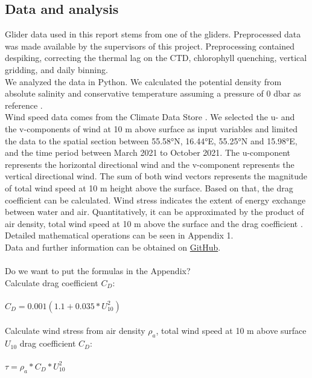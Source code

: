 \documentclass[../Main.tex]{subfiles}
\begin{document}
\subsection{Data and analysis}
Glider data used in this report stems from one of the gliders. 
Preprocessed data was made available by the supervisors of this project. 
Preprocessing contained despiking, correcting the thermal lag on the CTD, chlorophyll quenching, vertical gridding, and daily binning. 
\\
We analyzed the data in Python. We calculated the potential density from absolute salinity and conservative temperature assuming a pressure of 0 dbar as reference \cite{GSW2017}.
\\ 
Wind speed data comes from the Climate Data Store \cite{Era5}. 
We selected the u- and the v-components of wind at 10 m above surface as input variables and limited the data to the spatial section between 55.58°N, 16.44°E, 55.25°N and 15.98°E, and the time period between March 2021 to October 2021. 
The u-component represents the horizontal directional wind and the v-component represents the vertical directional wind. 
The sum of both wind vectors represents the magnitude of total wind speed at 10 m height above the surface. Based on that, the drag coefficient can be calculated. 
Wind stress indicates the extent of energy exchange between water and air.
Quantitatively, it can be approximated by the product of air density, total wind speed at 10 m above the surface and the drag coefficient \cite{Mehrfar2018}. Detailed mathematical operations can be seen in Appendix 1.
\\
Data and further information can be obtained on \href{https://github.com/joaldi2208/BloomDynamics}{GitHub}.
\\
\\
Do we want to put the formulas in the Appendix? 
\\
Calculate drag coefficient $C_D$:
\\
\\
$C_D = 0.001(1.1+0.035*U_10^2)$  
\\
\\
Calculate wind stress from air density $\rho_a$, total wind speed at 10 m above surface $U_10$ drag coefficient $C_D$:
\\
\\
$\tau = \rho_a*C_D*U_10^2$ 
\end{document}
